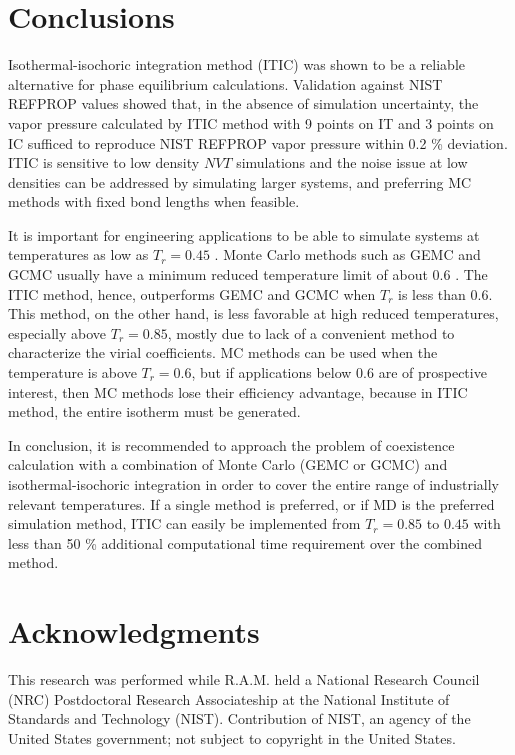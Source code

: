 \documentclass[5p,times]{elsarticle}
\begin{document}
\section{Conclusions} \label{sec:conclusion} 
Isothermal-isochoric integration method (ITIC) was shown to be a reliable alternative for phase equilibrium calculations. Validation against NIST REFPROP values showed that, in the absence of simulation uncertainty, the vapor pressure calculated by ITIC method with 9 points on IT and 3 points on IC sufficed to reproduce NIST REFPROP vapor pressure within 0.2 \% deviation. ITIC is sensitive to low density $NVT$ simulations and the noise issue at low densities can be addressed by simulating larger systems, and preferring MC methods with fixed bond lengths when feasible.

It is important for engineering applications to be able to simulate systems at temperatures as low as $T_r=0.45$ \cite{Reid1987}. Monte Carlo methods such as GEMC and GCMC usually have a minimum reduced temperature limit of about 0.6 \cite{Martin1998}. The ITIC method, hence, outperforms GEMC and GCMC when $T_r$ is less than 0.6. This method, on the other hand, is less favorable at high reduced temperatures, especially above $T_r=0.85$, mostly due to lack of a convenient method to characterize the virial coefficients. MC methods can be used when the temperature is above $T_r=0.6$, but if applications below 0.6 are of prospective interest, then MC methods lose their efficiency advantage, because in ITIC  method, the entire isotherm must be generated. 

In conclusion, it is recommended to approach the problem of coexistence calculation with a combination of Monte Carlo (GEMC or GCMC) and isothermal-isochoric  integration in order to cover the entire range of industrially relevant temperatures. If a single method is preferred, or if MD is the preferred simulation method, ITIC can easily be implemented from $T_r = 0.85$ to $0.45$ with less than 50 \% additional computational time requirement over the combined method.

\section{Acknowledgments}

This research was performed while R.A.M. held a National Research Council (NRC) Postdoctoral Research Associateship at the National Institute of Standards and Technology (NIST). Contribution of NIST, an agency of the United States government; not subject to copyright in the United States.
\end{document}
